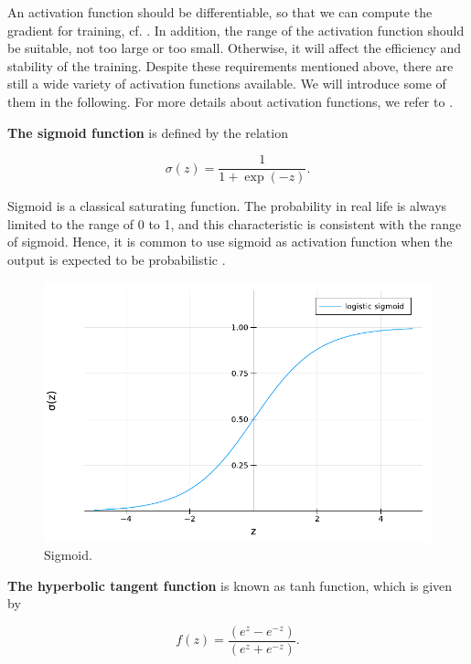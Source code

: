\documentclass[
	parskip, 			   %
	twoside, 			   %
	DIV=14, 			   %
	BCOR=15.0mm, 		   %
	headsepline, 		   %
	open=right, 		   %
	captions=tableheading, %
	bibliography=totoc,    %
	numbers=noenddot       %
]{scrreprt}
\begin{document}
An activation function should be differentiable, so that we can compute the gradient for training, cf. \cite{goodfellow2016deep}. In addition, the range of the activation function should be suitable, not too large or too small. Otherwise, it will affect the efficiency and stability of the training. Despite these requirements mentioned above, there are still a wide variety of activation functions available. We will introduce some of them in the following. For more details about activation functions, we refer to \cite{nwankpa2018activation}\cite{dubey2022activation}.

\textbf{The sigmoid function} is defined by the relation

\begin{equation}
    \label{eq:sigmoid}
    \sigma(z)=\frac{1}{1+\exp (-z)}.
\end{equation}

Sigmoid is a classical saturating function. The probability in real life is always limited to the range of 0 to 1, and this characteristic is consistent with the range of sigmoid. Hence, it is common to use sigmoid as activation function when the output is expected to be probabilistic \cite{nwankpa2018activation}. 

\begin{figure}[h!]
    \centering
    \includegraphics[scale=0.6]{figures/sigmoid.pdf}
    \caption{Sigmoid.}
    \label{fig:sigmoid}
\end{figure}

\textbf{The hyperbolic tangent function} is known as tanh function, which is given by

\begin{equation}
    \label{eq:tanh}
    f(z)=\frac{\left(e^{z}-e^{-z}\right)}{\left(e^{z}+e^{-z}\right)}.
\end{equation}
\end{document}
